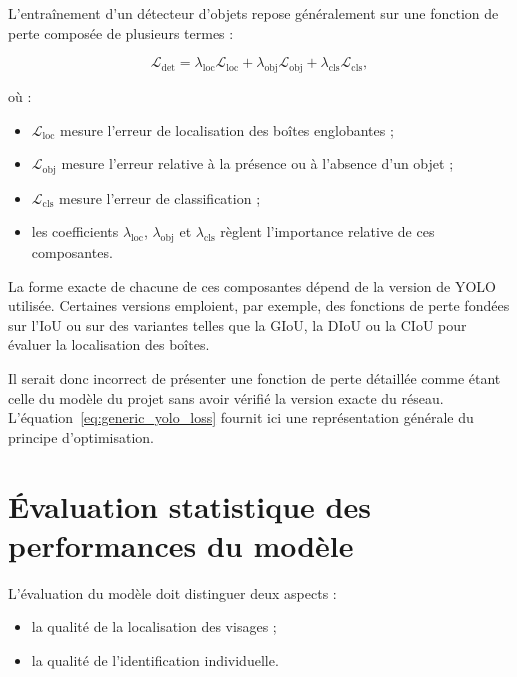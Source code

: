 \documentclass[11pt,a4paper]{report}
\begin{document}
L'entraînement d'un détecteur d'objets repose généralement sur une fonction de
perte composée de plusieurs termes :

\begin{equation}
    \mathcal{L}_{\mathrm{det}}
    =
    \lambda_{\mathrm{loc}}
    \mathcal{L}_{\mathrm{loc}}
    +
    \lambda_{\mathrm{obj}}
    \mathcal{L}_{\mathrm{obj}}
    +
    \lambda_{\mathrm{cls}}
    \mathcal{L}_{\mathrm{cls}},
    \label{eq:generic_yolo_loss}
\end{equation}

où :

\begin{itemize}
    \item $\mathcal{L}_{\mathrm{loc}}$ mesure l'erreur de localisation des
    boîtes englobantes ;
    \item $\mathcal{L}_{\mathrm{obj}}$ mesure l'erreur relative à la présence
    ou à l'absence d'un objet ;
    \item $\mathcal{L}_{\mathrm{cls}}$ mesure l'erreur de classification ;
    \item les coefficients $\lambda_{\mathrm{loc}}$,
    $\lambda_{\mathrm{obj}}$ et $\lambda_{\mathrm{cls}}$ règlent
    l'importance relative de ces composantes.
\end{itemize}

La forme exacte de chacune de ces composantes dépend de la version de YOLO
utilisée. Certaines versions emploient, par exemple, des fonctions de perte
fondées sur l'IoU ou sur des variantes telles que la GIoU, la DIoU ou la CIoU
pour évaluer la localisation des boîtes.

Il serait donc incorrect de présenter une fonction de perte détaillée comme
étant celle du modèle du projet sans avoir vérifié la version exacte du réseau.
L'équation~\eqref{eq:generic_yolo_loss} fournit ici une représentation générale
du principe d'optimisation.

\section{Évaluation statistique des performances du modèle}
\label{sec:eval-theorie}

L'évaluation du modèle doit distinguer deux aspects :

\begin{itemize}
    \item la qualité de la localisation des visages ;
    \item la qualité de l'identification individuelle.
\end{itemize}
\end{document}
